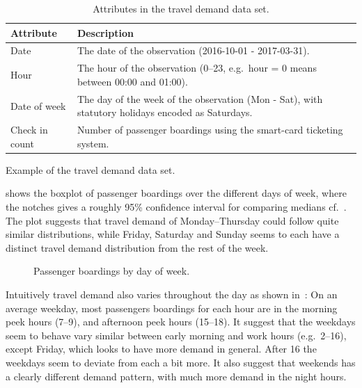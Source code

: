 \documentclass[a4paper,11pt]{article}
\begin{document}
\begin{table}[!ht]
    \center
    \begin{tabular}{p{1in}p{4in}}        
        Attribute & Description \\
        \hline 
        \hline         
        Date & The date of the observation (2016-10-01 - 2017-03-31). \\
        \hline 
        Hour & The hour of the observation (0--23, e.g.\ hour = 0 means between 00:00 and 01:00). \\
        \hline 
        Date of week & The day of the week of the observation (Mon - Sat), with statutory holidays encoded as Saturdays. \\
        \hline 
        Check in count & Number of passenger boardings using the smart-card ticketing system. \\
    \end{tabular}
    \caption{Attributes in the travel demand data set.}
    \label{tab:travel_demand_data_attr}
\end{table}

\begin{table}[!ht]
    \center
    
    \caption{Example of the travel demand data set.}
    \label{tab:travel_demand_data_example}
\end{table}


 shows the boxplot of passenger boardings over the different days of week, where the notches gives a roughly 95\% confidence interval for comparing medians cf.~\citet{Boxplots}. The plot suggests that travel demand of Monday--Thursday could follow quite similar distributions, while Friday, Saturday and Sunday seems to each have a distinct travel demand distribution from the rest of the week.

\clearpage
\begin{figure}[!ht]
    \center
    
    \caption{Passenger boardings by day of week.}
    \label{fig:travelcard_boxplot}
\end{figure}

Intuitively travel demand also varies throughout the day as shown in~: On an average weekday, most passengers boardings for each hour are in the morning peek hours (7--9), and afternoon peek hours (15--18). It suggest that the weekdays seem to behave vary similar between early morning and work hours (e.g.\ 2--16), except Friday, which looks to have more demand in general. After 16 the weekdays seem to deviate from each a bit more. It also suggest that weekends has a clearly different demand pattern, with much more demand in the night hours.
\end{document}
